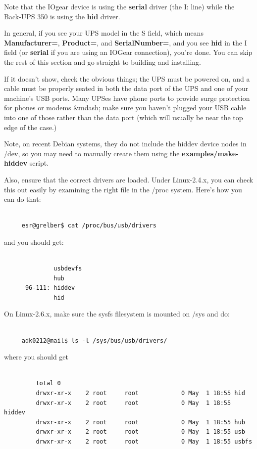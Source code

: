 Note that the IOgear device is using the {\bf serial} driver (the I: line)
while the Back-UPS 350 is using the {\bf hid} driver.  

In general, if you see your UPS model in the S field, which means {\bf
Manufacturer=}, {\bf Product=}, and {\bf SerialNumber=}, and you see {\bf hid}
in the I field (or {\bf serial} if you are using an IOGear connection), you're
done.  You can skip the rest of this section and go straight to building and
installing.  

If it doesn't show, check the obvious things; the UPS must be powered on, and
a cable must be properly seated in both the data port of the UPS and one of
your machine's USB ports.  Many UPSes have phone ports to provide surge
protection for phones or modems \&mdash; make sure you haven't plugged your
USB cable into one of those rather than the data port (which will usually be
near the top edge of the case.)  

Note, on recent Debian systems, they do not include the hiddev device nodes in
/dev, so you may need to manually create them using the {\bf
examples/make-hiddev} script.  

Also, ensure that the correct drivers are loaded. Under Linux-2.4.x, you can
check this out easily by examining the right file in the /proc system.  Here's
how you can do that: 

\footnotesize
\begin{verbatim}
     
     esr@grelber$ cat /proc/bus/usb/drivers
\end{verbatim}
\normalsize

and you should get: 

\footnotesize
\begin{verbatim}
     
              usbdevfs
              hub
      96-111: hiddev
              hid
\end{verbatim}
\normalsize

On Linux-2.6.x, make sure the sysfs filesystem is mounted on /sys and do: 

\footnotesize
\begin{verbatim}
     
     adk0212@mail$ ls -l /sys/bus/usb/drivers/
\end{verbatim}
\normalsize

where you should get 

\footnotesize
\begin{verbatim}
     
         total 0
         drwxr-xr-x    2 root     root            0 May  1 18:55 hid
         drwxr-xr-x    2 root     root            0 May  1 18:55 hiddev
         drwxr-xr-x    2 root     root            0 May  1 18:55 hub
         drwxr-xr-x    2 root     root            0 May  1 18:55 usb
         drwxr-xr-x    2 root     root            0 May  1 18:55 usbfs
\end{verbatim}
\normalsize

